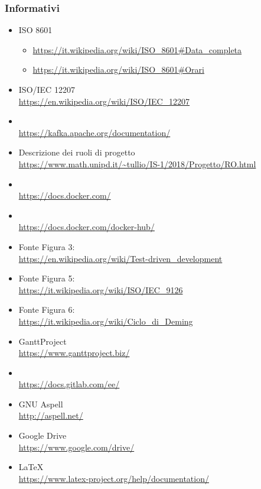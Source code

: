     \subsubsection{Informativi}	\label{rifinfo}
    \begin{itemize}
    	\item ISO 8601
    	\begin{itemize}
    		\item \url{https://it.wikipedia.org/wiki/ISO\_8601#Data_completa}
    		\item \url{https://it.wikipedia.org/wiki/ISO\_8601#Orari}
    	\end{itemize}
    	\item ISO/IEC 12207 \\\url{https://en.wikipedia.org/wiki/ISO/IEC_12207}
		\item {} \\\url{https://kafka.apache.org/documentation/}
        \item Descrizione dei ruoli di progetto \\\url{https://www.math.unipd.it/~tullio/IS-1/2018/Progetto/RO.html}
        \item {} \\\url{https://docs.docker.com/}
        \item {} \\\url{https://docs.docker.com/docker-hub/}
        \item Fonte Figura 3: \\\url{https://en.wikipedia.org/wiki/Test-driven_development}
        \item Fonte Figura 5: \\\url{https://it.wikipedia.org/wiki/ISO/IEC_9126}
        \item Fonte Figura 6: \\\url{https://it.wikipedia.org/wiki/Ciclo_di_Deming}
        \item GanttProject \\\url{https://www.ganttproject.biz/}
		\item {} \\\url{https://docs.gitlab.com/ee/}
		\item GNU Aspell \\\url{http://aspell.net/}
        \item Google Drive \\\url{https://www.google.com/drive/}
		\item \LaTeX\ \\\url{https://www.latex-project.org/help/documentation/}

\end{itemize}

